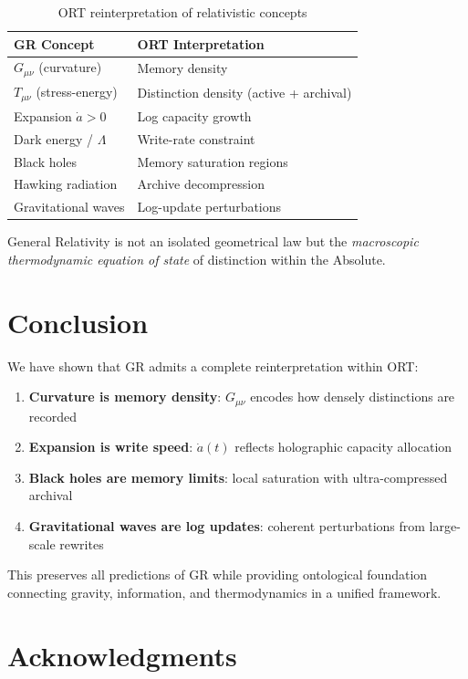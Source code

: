 \documentclass[12pt,a4paper]{article}
\begin{document}
\begin{table}[h]
\centering
\begin{tabular}{|l|l|}
\hline
\textbf{GR Concept} & \textbf{ORT Interpretation} \\
\hline
$G_{\mu\nu}$ (curvature) & Memory density \\
$T_{\mu\nu}$ (stress-energy) & Distinction density (active + archival) \\
Expansion $\dot{a} > 0$ & Log capacity growth \\
Dark energy / $\Lambda$ & Write-rate constraint \\
Black holes & Memory saturation regions \\
Hawking radiation & Archive decompression \\
Gravitational waves & Log-update perturbations \\
\hline
\end{tabular}
\caption{ORT reinterpretation of relativistic concepts}
\end{table}

General Relativity is not an isolated geometrical law but the \emph{macroscopic thermodynamic equation of state} of distinction within the Absolute.

\section{Conclusion}

We have shown that GR admits a complete reinterpretation within ORT:
\begin{enumerate}
    \item \textbf{Curvature is memory density}: $G_{\mu\nu}$ encodes how densely distinctions are recorded
    \item \textbf{Expansion is write speed}: $\dot{a}(t)$ reflects holographic capacity allocation
    \item \textbf{Black holes are memory limits}: local saturation with ultra-compressed archival
    \item \textbf{Gravitational waves are log updates}: coherent perturbations from large-scale rewrites
\end{enumerate}

This preserves all predictions of GR while providing ontological foundation connecting gravity, information, and thermodynamics in a unified framework.

\section*{Acknowledgments}
\end{document}
